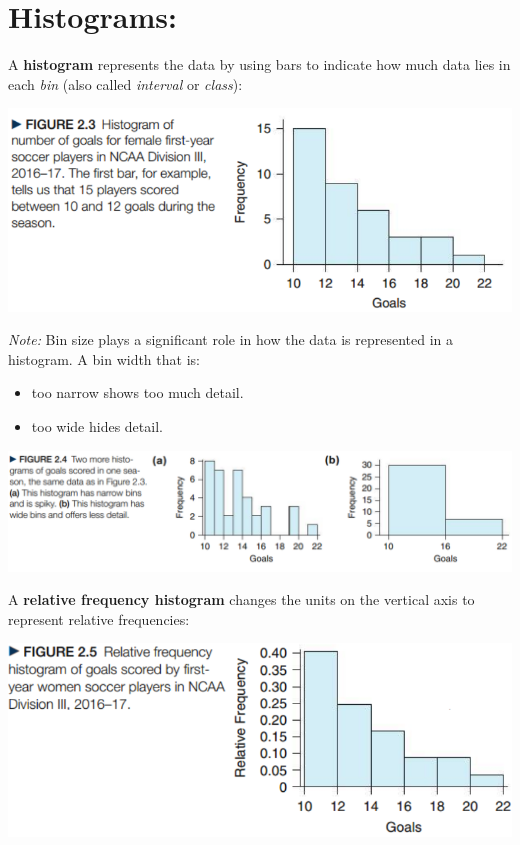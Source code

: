 \documentclass[../mathNotesPreamble]{subfiles}
\begin{document}
  \section*{Histograms:}
  \noindent
  A \textbf{histogram} represents the data by using bars to indicate how much data lies in each \emph{bin} (also called \emph{interval} or \emph{class}):
  \begin{center}
    \includegraphics[width=0.65\linewidth]{images/math211_figure_2p03}
  \end{center}
  \pagebreak
  
  \emph{Note:} Bin size plays a significant role in how the data is represented in a histogram. A bin width that is:
  \begin{itemize}
    \item too narrow shows too much detail.
    \item too wide hides detail.
  \end{itemize}
  \begin{center}
    \includegraphics[width=0.85\linewidth]{images/math211_figure_2p04}
  \end{center}
  A \textbf{relative frequency histogram} changes the units on the vertical axis to represent relative frequencies:
  \begin{center}
    \includegraphics[width=0.65\linewidth]{images/math211_figure_2p05}
  \end{center}
  \pagebreak
  
\end{document}
